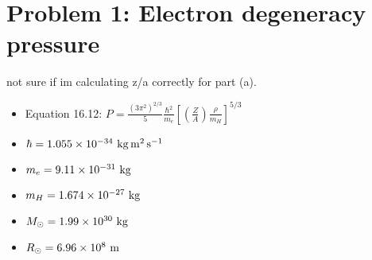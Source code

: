 \documentclass[11pt,letterpaper]{article}
\begin{document}
\section*{Problem 1: Electron degeneracy pressure}

{\Huge not sure if im calculating z/a correctly for part (a).}

\begin{itemize}
    \item Equation 16.12: $P = \frac{(3\pi^2)^{2/3}}{5}\frac{\hbar^2}{m_e}\left[\left(\frac{Z}{A}\right)\frac{\rho}{m_H}\right]^{5/3}$
    \item $\hbar = 1.055\times 10^{-34}~{\rm kg\,m^2\,s^{-1}}$
    \item $m_e = 9.11\times 10^{-31}~{\rm kg}$
    \item $m_H = 1.674\times 10^{-27}~{\rm kg}$
    \item $M_\odot = 1.99\times 10^{30}~{\rm kg}$
    \item $R_\odot = 6.96\times 10^{8}~{\rm m}$
\end{itemize}
\end{document}
